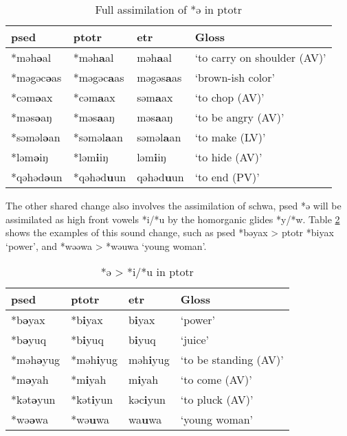\begin{table}[!htbp]
\centering
\caption{Full assimilation of *ə in \acl{ptotr}}
\label{tab:totrsc1}
\begin{tabular}{llll}
\hline
\acs{psed}     & \acs{ptotr}    & \acs{etr}   & Gloss                       \\ \hline
*məh\textbf{ə}al   & *məh\textbf{a}al   & məh\textbf{a}al   & `to carry on shoulder (AV)' \\
*məgəc\textbf{ə}as & *məgəc\textbf{a}as & məgəs\textbf{a}as & `brown-ish color'           \\
*cəm\textbf{ə}ax   & *cəm\textbf{a}ax   & səm\textbf{a}ax   & `to chop (AV)'              \\
*məs\textbf{ə}aŋ   & *məs\textbf{a}aŋ   & məs\textbf{a}aŋ   & `to be angry (AV)'          \\
*səməl\textbf{ə}an & *səməl\textbf{a}an & səməl\textbf{a}an & `to make (LV)'              \\
*ləm\textbf{ə}iŋ   & *ləm\textbf{i}iŋ   & ləm\textbf{i}iŋ   & `to hide (AV)'              \\
*qəhəd\textbf{ə}un & *qəhəd\textbf{u}un & qəhəd\textbf{u}un & `to end (PV)'               \\ \hline
\end{tabular}
\end{table}

The other shared change also involves the assimilation of schwa, \acl{psed} *ə will be assimilated as high front vowels *i/*u by the homorganic glides *y/*w. Table \ref{tab:totrsc2} shows the examples of this sound change, such as \acl{psed} *bəyax > \acl{ptotr} *biyax `power', and *wəəwa > *wəuwa `young woman'. 

\begin{table}[!htbp]
\centering
\caption{*ə > *i/*u in \acl{ptotr}}
\label{tab:totrsc2}
\begin{tabular}{llll}
\hline
\acs{psed}     & \acs{ptotr}    & \acs{etr}   & Gloss                       \\ \hline
*b\textbf{ə}yax   & *b\textbf{i}yax   & b\textbf{i}yax   & `power'               \\
*b\textbf{ə}yuq   & *b\textbf{i}yuq   & b\textbf{i}yuq   & `juice'               \\
*məh\textbf{ə}yug & *məh\textbf{i}yug & məh\textbf{i}yug & `to be standing (AV)' \\
*m\textbf{ə}yah   & *m\textbf{i}yah   & m\textbf{i}yah   & `to come (AV)'        \\
*kət\textbf{ə}yun & *kət\textbf{i}yun & kəc\textbf{i}yun & `to pluck (AV)'       \\ 
*wə\textbf{ə}wa & *wə\textbf{u}wa & wa\textbf{u}wa & `young woman'       \\ \hline
\end{tabular}
\end{table}


